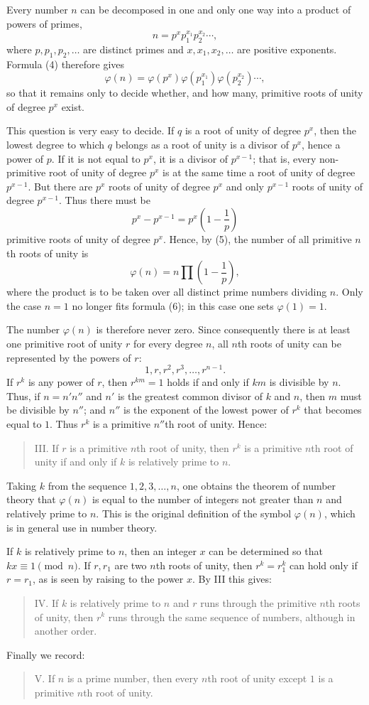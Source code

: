 \documentclass[11pt]{article}
\begin{document}
Every number $n$ can be decomposed in one and only one way into a product of powers of primes,
\[
        n=p^x p_1^{x_1}p_2^{x_2}\cdots,
\]
where $p,p_1,p_2,\ldots$ are distinct primes and $x,x_1,x_2,\ldots$ are positive exponents. Formula (4) therefore gives
\[
\tag{5}        \varphi(n)=\varphi(p^x)\varphi(p_1^{x_1})\varphi(p_2^{x_2})\cdots,
\]
so that it remains only to decide whether, and how many, primitive roots of unity of degree $p^x$ exist.

This question is very easy to decide. If $q$ is a root of unity of degree $p^x$, then the lowest degree to which $q$ belongs as a root of unity is a divisor of $p^x$, hence a power of $p$. If it is not equal to $p^x$, it is a divisor of $p^{x-1}$; that is, every non-primitive root of unity of degree $p^x$ is at the same time a root of unity of degree $p^{x-1}$. But there are $p^x$ roots of unity of degree $p^x$ and only $p^{x-1}$ roots of unity of degree $p^{x-1}$. Thus there must be
\[
        p^x-p^{x-1}=p^x\left(1-\frac1p\right)
\]
primitive roots of unity of degree $p^x$. Hence, by (5), the number of all primitive $n$th roots of unity is
\[
\tag{6}        \varphi(n)=n\prod\left(1-\frac1p\right),
\]
where the product is to be taken over all distinct prime numbers dividing $n$. Only the case $n=1$ no longer fits formula (6); in this case one sets $\varphi(1)=1$.

The number $\varphi(n)$ is therefore never zero. Since consequently there is at least one primitive root of unity $r$ for every degree $n$, all $n$th roots of unity can be represented by the powers of $r$:
\[
\tag{7}        1,r,r^2,r^3,\ldots,r^{n-1}.
\]
If $r^k$ is any power of $r$, then $r^{km}=1$ holds if and only if $km$ is divisible by $n$. Thus, if $n=n'n''$ and $n'$ is the greatest common divisor of $k$ and $n$, then $m$ must be divisible by $n''$; and $n''$ is the exponent of the lowest power of $r^k$ that becomes equal to $1$. Thus $r^k$ is a primitive $n''$th root of unity. Hence:
\begin{quote}
III. If $r$ is a primitive $n$th root of unity, then $r^k$ is a primitive $n$th root of unity if and only if $k$ is relatively prime to $n$.
\end{quote}
Taking $k$ from the sequence $1,2,3,\ldots,n$, one obtains the theorem of number theory that $\varphi(n)$ is equal to the number of integers not greater than $n$ and relatively prime to $n$. This is the original definition of the symbol $\varphi(n)$, which is in general use in number theory.

If $k$ is relatively prime to $n$, then an integer $x$ can be determined so that $kx\equiv1\pmod n$. If $r,r_1$ are two $n$th roots of unity, then $r^k=r_1^k$ can hold only if $r=r_1$, as is seen by raising to the power $x$. By III this gives:
\begin{quote}
IV. If $k$ is relatively prime to $n$ and $r$ runs through the primitive $n$th roots of unity, then $r^k$ runs through the same sequence of numbers, although in another order.
\end{quote}
Finally we record:
\begin{quote}
V. If $n$ is a prime number, then every $n$th root of unity except $1$ is a primitive $n$th root of unity.
\end{quote}
\end{document}
